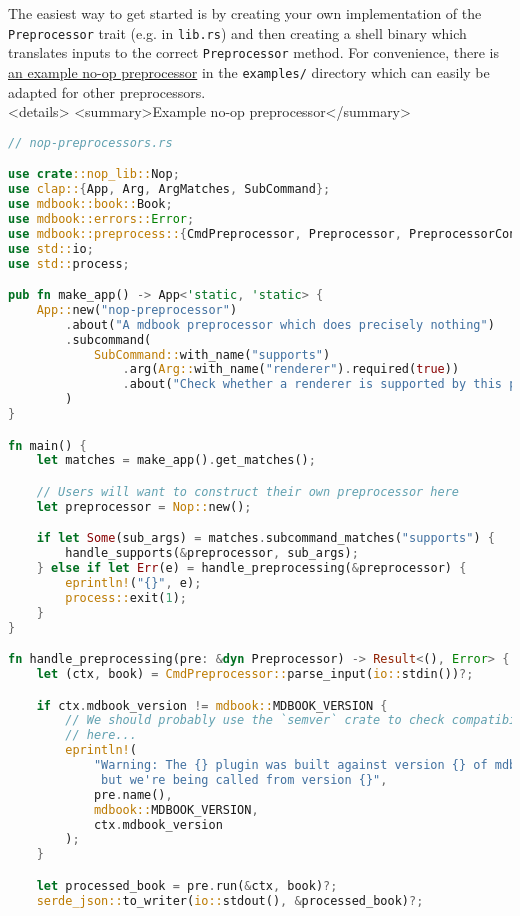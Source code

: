 \documentclass{article}
\begin{document}
The easiest way to get started is by creating your own implementation of the
\lstinline|Preprocessor| trait (e.g. in \lstinline|lib.rs|) and then creating a shell binary which
translates inputs to the correct \lstinline|Preprocessor| method. For convenience, there
is \href{https://github.com/rust-lang-nursery/mdBook/blob/master/examples/nop-preprocessor.rs}{an example no-op preprocessor} in the \lstinline|examples/| directory which can easily
be adapted for other preprocessors.\\
<details>
<summary>Example no-op preprocessor</summary>
\begin{lstlisting}[language=rust]
// nop-preprocessors.rs

use crate::nop_lib::Nop;
use clap::{App, Arg, ArgMatches, SubCommand};
use mdbook::book::Book;
use mdbook::errors::Error;
use mdbook::preprocess::{CmdPreprocessor, Preprocessor, PreprocessorContext};
use std::io;
use std::process;

pub fn make_app() -> App<'static, 'static> {
    App::new("nop-preprocessor")
        .about("A mdbook preprocessor which does precisely nothing")
        .subcommand(
            SubCommand::with_name("supports")
                .arg(Arg::with_name("renderer").required(true))
                .about("Check whether a renderer is supported by this preprocessor"),
        )
}

fn main() {
    let matches = make_app().get_matches();

    // Users will want to construct their own preprocessor here
    let preprocessor = Nop::new();

    if let Some(sub_args) = matches.subcommand_matches("supports") {
        handle_supports(&preprocessor, sub_args);
    } else if let Err(e) = handle_preprocessing(&preprocessor) {
        eprintln!("{}", e);
        process::exit(1);
    }
}

fn handle_preprocessing(pre: &dyn Preprocessor) -> Result<(), Error> {
    let (ctx, book) = CmdPreprocessor::parse_input(io::stdin())?;

    if ctx.mdbook_version != mdbook::MDBOOK_VERSION {
        // We should probably use the `semver` crate to check compatibility
        // here...
        eprintln!(
            "Warning: The {} plugin was built against version {} of mdbook, \
             but we're being called from version {}",
            pre.name(),
            mdbook::MDBOOK_VERSION,
            ctx.mdbook_version
        );
    }

    let processed_book = pre.run(&ctx, book)?;
    serde_json::to_writer(io::stdout(), &processed_book)?;


\end{lstlisting}
\end{document}

